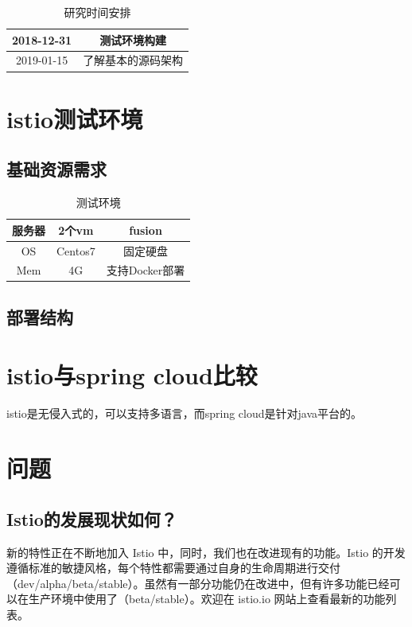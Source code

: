 \documentclass{ctexart}
\begin{document}
\begin{table}[h]
	\centering
	\caption{研究时间安排}
	\begin{tabular}{|c|c|}
		\hline
		2018-12-31 & 测试环境构建 \\\hline
		2019-01-15 & 了解基本的源码架构 \\\hline
	\end{tabular}
\end{table}

\section{istio测试环境}
\subsection{基础资源需求}

\begin{table}[h]
	\centering
	\caption{测试环境}\label{tab:tab1}
	\begin{tabular}{|c|c|c|}
		\hline
		服务器 & 2个vm & fusion \\\hline
		OS & Centos7 & 固定硬盘 \\\hline
		Mem & 4G  & 支持Docker部署 \\
		\hline
	\end{tabular}
\end{table}


\subsection{部署结构}


\section{istio与spring cloud比较}
istio是无侵入式的，可以支持多语言，而spring cloud是针对java平台的。

\section{问题}
\subsection{Istio的发展现状如何？}

新的特性正在不断地加入 Istio 中，同时，我们也在改进现有的功能。Istio 的开发遵循标准的敏捷风格，每个特性都需要通过自身的生命周期进行交付（dev/alpha/beta/stable）。虽然有一部分功能仍在改进中，但有许多功能已经可以在生产环境中使用了（beta/stable）。欢迎在 istio.io 网站上查看最新的功能列表。
\end{document}

